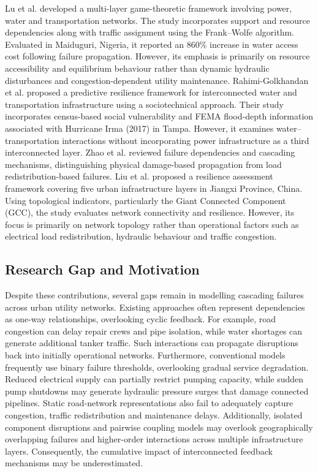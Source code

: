 \documentclass[oneside]{ieeeaccess}
\begin{document}
Lu et al. \cite{b3} developed a multi-layer game-theoretic framework involving power, water and transportation networks. The study incorporates support and resource dependencies along with traffic assignment using the Frank--Wolfe algorithm. Evaluated in Maiduguri, Nigeria, it reported an 860\% increase in water access cost following failure propagation. However, its emphasis is primarily on resource accessibility and equilibrium behaviour rather than dynamic hydraulic disturbances and congestion-dependent utility maintenance. Rahimi-Golkhandan et al. \cite{b4} proposed a predictive resilience framework for interconnected water and transportation infrastructure using a sociotechnical approach. Their study incorporates census-based social vulnerability and FEMA flood-depth information associated with Hurricane Irma (2017) in Tampa. However, it examines water--transportation interactions without incorporating power infrastructure as a third interconnected layer. Zhao et al. \cite{b5} reviewed failure dependencies and cascading mechanisms, distinguishing physical damage-based propagation from load redistribution-based failures. Liu et al. \cite{b6} proposed a resilience assessment framework covering five urban infrastructure layers in Jiangxi Province, China. Using topological indicators, particularly the Giant Connected Component (GCC), the study evaluates network connectivity and resilience. However, its focus is primarily on network topology rather than operational factors such as electrical load redistribution, hydraulic behaviour and traffic congestion.

\subsection{Research Gap and Motivation}

Despite these contributions, several gaps remain in modelling cascading failures across urban utility networks. Existing approaches often represent dependencies as one-way relationships, overlooking cyclic feedback. For example, road congestion can delay repair crews and pipe isolation, while water shortages can generate additional tanker traffic. Such interactions can propagate disruptions back into initially operational networks. Furthermore, conventional models frequently use binary failure thresholds, overlooking gradual service degradation. Reduced electrical supply can partially restrict pumping capacity, while sudden pump shutdowns may generate hydraulic pressure surges that damage connected pipelines. Static road-network representations also fail to adequately capture congestion, traffic redistribution and maintenance delays. Additionally, isolated component disruptions and pairwise coupling models may overlook geographically overlapping failures and higher-order interactions across multiple infrastructure layers. Consequently, the cumulative impact of interconnected feedback mechanisms may be underestimated.
\end{document}
